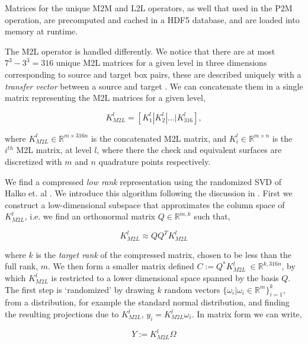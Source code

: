 \documentclass{IEEEcsmag}
\begin{document}
Matrices for the unique M2M and L2L operators, as well that used in the P2M operation, are precomputed and cached in a HDF5 database, and are loaded into memory at runtime.

The M2L operator is handled differently. We notice that there are at most $7^3-3^3=316$ unique M2L matrices for a given level in three dimensions corresponding to source and target box pairs, these are described uniquely with a \textit{transfer vector} between a source and target \cite{Fong2009}. We can concatenate them in a single matrix representing the M2L matrices for a given level,

\begin{equation}
    K_{M2L}^{l} = \left [ K^l_1 | K^l_2 | ... | K^l_{316} \right],
    \label{eq:2_4_concatenated_m2l}
\end{equation}

where $K_{M2L}^l \in \mathbb{R}^{m \times 316n}$ is the concatenated M2L matrix, and $K_i^l \in \mathbb{R}^{m \times n}$ is the $i^{th}$ M2L matrix, at level $l$, where there the check and equivalent surfaces are discretized with $m$ and $n$ quadrature points respectively.

We find a compressed \textit{low rank} representation using the randomized SVD of Halko et. al \cite{Halko2011}. We introduce this algorithm following the discussion in \cite{Erichson}. First we construct a low-dimensional subspace that approximates the column space of $K_{M2L}^l$, i.e. we
find an orthonormal matrix $Q \in \mathbb{R}^{m, k}$ such that,

\begin{equation}
    K_{M2L}^l \approx QQ^TK_{M2L}^l
    \label{eq:2_4_step_1_randomised}
\end{equation}

where $k$ is the \textit{target rank} of the compressed matrix, chosen to be less than the full rank, $m$. We then form a smaller matrix defined $C := Q^*K_{M2L}^l \> \in \mathbb{R}^{k, 316n}$, by which $K_{M2L}^l$ is restricted to a lower dimensional space spanned by the basis $Q$. The first step is `randomized' by drawing $k$ random vectors $\{ \omega_i | \omega_i \in \mathbb{R}^m \}_{i=1}^k$, from a distribution, for example the standard normal distribution, and finding the resulting projections due to $K_{M2L}^l$, $y_i = K_{M2L}^l \omega_i$. In matrix form we can write,

\begin{equation}
    Y := K_{M2L}^l \Omega
\end{equation}
\end{document}
